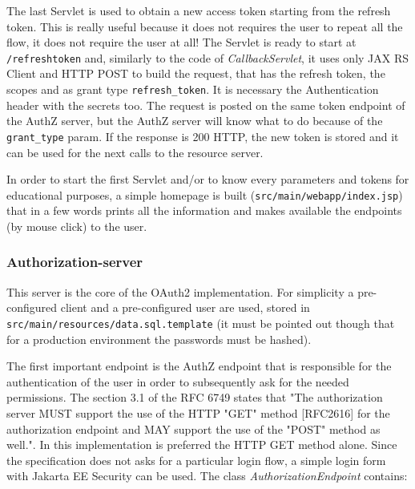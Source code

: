 The last Servlet is used to obtain a new access token starting from the refresh token. This is really useful because it does not requires the user to repeat all the flow, it does not require the user at all! The Servlet is ready to start at \texttt{/refreshtoken} and, similarly to the code of \textit{CallbackServlet}, it uses only JAX RS Client and HTTP POST to build the request, that has the refresh token, the scopes and as grant type \texttt{refresh\_token}. It is necessary the Authentication header with the secrets too. The request is posted on the same token endpoint of the AuthZ server, but the AuthZ server will know what to do because of the \texttt{grant\_type} param. If the response is 200 HTTP, the new token is stored and it can be used for the next calls to the resource server.

In order to start the first Servlet and/or to know every parameters and tokens for educational purposes, a simple homepage is built (\texttt{src/main/webapp/index.jsp}) that in a few words prints all the information and makes available the endpoints (by mouse click) to the user.



\subsubsection{Authorization-server}
This server is the core of the OAuth2 implementation. For simplicity a pre-configured client and a pre-configured user are used, stored in \texttt{src/main/resources/data.sql.template} (it must be pointed out though that for a production environment the passwords must be hashed). 

The first important endpoint is the AuthZ endpoint that is responsible for the authentication of the user in order to subsequently ask for the needed permissions. The section 3.1 of the RFC 6749 states that "The authorization server MUST support the use of the HTTP "GET" method [RFC2616] for the authorization endpoint and MAY support the use of the "POST" method as well.". In this implementation is preferred the HTTP GET method alone. Since the specification does not asks for a particular login flow, a simple login form with Jakarta EE Security can be used. The class \textit{AuthorizationEndpoint} contains:

